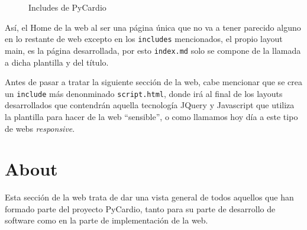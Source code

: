 \begin{figure}[H]
    \centering
    \caption{Includes de PyCardio}
    \label{fig:includ}
\end{figure}

Así, el Home de la web al ser una página única que no va a tener parecido alguno en lo restante de web excepto en los \texttt{includes} mencionados, el propio layout main, es la página desarrollada, por esto \texttt{index.md} solo se compone de la llamada a dicha plantilla y del título. 

Antes de pasar a tratar la siguiente sección de la web, cabe mencionar que se crea un \texttt{include} más denonminado \texttt{script.html}, donde irá al final de los layouts desarrollados que contendrán aquella tecnología JQuery y Javascript que utiliza la plantilla para hacer de la web   ``sensible'', o como llamamos hoy  día a este tipo de webs \textit{responsive}.
\section{About}
\label{sec:aboutWeb}
Esta sección de la web trata de dar una vista general de todos aquellos que han formado parte del proyecto PyCardio, tanto para su parte de desarrollo de software como en la parte de implementación de la web. 

